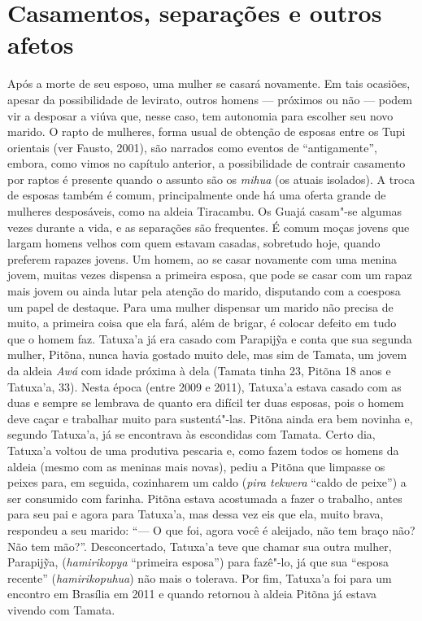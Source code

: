 \section{Casamentos, separações e outros
afetos}\label{casamentos-separauxe7uxf5es-e-outros-afetos}

Após a morte de seu esposo, uma mulher se casará novamente. Em tais
ocasiões, apesar da possibilidade de levirato, outros homens --- próximos
ou não --- podem vir a desposar a viúva que, nesse caso, tem autonomia
para escolher seu novo marido. O rapto de mulheres, forma usual de
obtenção de esposas entre os Tupi orientais (ver Fausto, 2001), são
narrados como eventos de ``antigamente'', embora, como vimos no capítulo
anterior, a possibilidade de contrair casamento por raptos é presente
quando o assunto são os \emph{mihua} (os atuais isolados). A troca de
esposas também é comum, principalmente onde há uma oferta grande de
mulheres desposáveis, como na aldeia Tiracambu. Os Guajá casam"-se
algumas vezes durante a vida, e as separações são frequentes. É comum
moças jovens que largam homens velhos com quem estavam casadas,
sobretudo hoje, quando preferem rapazes jovens. Um homem, ao se casar
novamente com uma menina jovem, muitas vezes dispensa a primeira esposa,
que pode se casar com um rapaz mais jovem ou ainda lutar pela atenção do
marido, disputando com a coesposa um papel de destaque. Para uma mulher
dispensar um marido não precisa de muito, a primeira coisa que ela fará,
além de brigar, é colocar defeito em tudo que o homem faz. Tatuxa'a já
era casado com Parapijỹa e conta que sua segunda mulher, Pitõna, nunca
havia gostado muito dele, mas sim de Tamata, um jovem da aldeia
\emph{Awá} com idade próxima à dela (Tamata tinha 23, Pitõna 18 anos e
Tatuxa'a, 33). Nesta época (entre 2009 e 2011), Tatuxa'a estava casado
com as duas e sempre se lembrava de quanto era difícil ter duas esposas,
pois o homem deve caçar e trabalhar muito para sustentá"-las. Pitõna
ainda era bem novinha e, segundo Tatuxa'a, já se encontrava às
escondidas com Tamata. Certo dia, Tatuxa'a voltou de uma produtiva
pescaria e, como fazem todos os homens da aldeia (mesmo com as meninas
mais novas), pediu a Pitõna que limpasse os peixes para, em seguida,
cozinharem um caldo (\emph{pira tekwera} ``caldo de peixe'') a ser
consumido com farinha. Pitõna estava acostumada a fazer o trabalho,
antes para seu pai e agora para Tatuxa'a, mas dessa vez eis que ela,
muito brava, respondeu a seu marido: ``--- O que foi, agora você é
aleijado, não tem braço não? Não tem mão?''. Desconcertado, Tatuxa'a teve
que chamar sua outra mulher, Parapijỹa, (\emph{hamirikopya} ``primeira
esposa'') para fazê"-lo, já que sua ``esposa recente''
(\emph{hamirikopuhua}) não mais o tolerava. Por fim, Tatuxa'a foi para
um encontro em Brasília em 2011 e quando retornou à aldeia Pitõna já
estava vivendo com Tamata.

